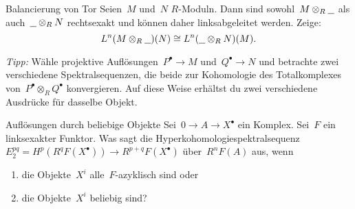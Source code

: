 \documentclass{uebblatt}
\begin{document}
\begin{aufgabe}{Balancierung von Tor}
Seien~$M$ und~$N$ $R$-Moduln. Dann sind sowohl~$M \otimes_R \underline{\ \ }$
als auch~$\underline{\ \ } \otimes_R N$ rechtsexakt und können daher
linksabgeleitet werden. Zeige:
\[ L^n(M \otimes_R \underline{\ \ })(N) \cong L^n(\underline{\ \ } \otimes_R
N)(M). \]
{\tiny\emph{Tipp:} Wähle projektive Auflösungen~$P^\bullet \to M$
und~$Q^\bullet \to N$ und betrachte zwei verschiedene Spektralsequenzen, die
beide zur Kohomologie des Totalkomplexes von~$P^\bullet \otimes_R Q^\bullet$
konvergieren. Auf diese Weise erhältst du zwei verschiedene Ausdrücke für
dasselbe Objekt.\par}
\end{aufgabe}

\begin{aufgabe}{Auflösungen durch beliebige Objekte}
Sei~$0 \to A \to X^\bullet$ ein Komplex. Sei~$F$ ein linksexakter Funktor. Was
sagt die Hyperkohomologiespektralsequenz
$E^{pq}_2 = H^p(R^q F(X^\bullet)) \to R^{p+q}F(X^\bullet)$ über~$R^nF(A)$ aus,
wenn
\begin{enumerate}
\item die Objekte~$X^i$ alle~$F$-azyklisch sind oder
\item die Objekte~$X^i$ beliebig sind?
\end{enumerate}
\end{aufgabe}
\end{document}
